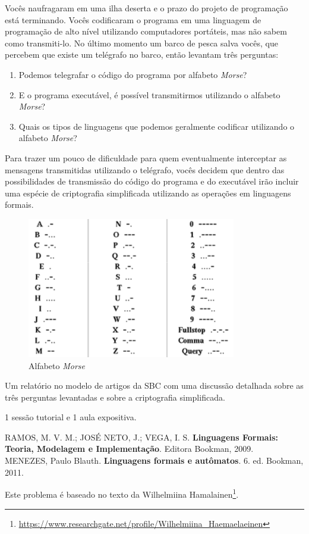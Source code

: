 Vocês naufragaram em uma ilha deserta e o prazo do projeto de programação está terminando.
Vocês codificaram o programa em uma linguagem de programação de alto nível utilizando computadores
portáteis, mas não sabem como transmiti-lo.
No último momento um barco de pesca salva vocês, que percebem que existe um telégrafo no barco, então levantam três perguntas:
\begin{enumerate}
    \item Podemos telegrafar o código do programa por alfabeto \textit{Morse}?
    \item E o programa executável, é possível transmitirmos utilizando o alfabeto \textit{Morse}?
    \item Quais os tipos de linguagens que podemos geralmente codificar utilizando o alfabeto \textit{Morse}?
\end{enumerate}

Para trazer um pouco de dificuldade para quem eventualmente interceptar as mensagens transmitidas
utilizando o telégrafo, vocês decidem que dentro das possibilidades de transmissão do código do programa
e do executável irão incluir uma espécie de criptografia simplificada utilizando as operações
em linguagens formais.

\begin{figure}[!htb]
\centering
\includegraphics[scale=0.5]{apendice/problemas/problema1a/fig2.png}
\caption{Alfabeto \textit{Morse}}
\label{fig2}
\end{figure}

Um relatório no modelo de artigos da SBC com uma discussão detalhada sobre as três perguntas levantadas
e sobre a criptografia simplificada.

1 sessão tutorial e 1 aula expositiva.


\noindent
RAMOS, M. V. M.; JOSÉ NETO, J.; VEGA, I. S. \textbf{Linguagens Formais: Teoria, Modelagem e Implementação}. Editora Bookman, 2009.\\

\noindent
MENEZES, Paulo Blauth. \textbf{Linguagens formais e autômatos}. 6. ed. Bookman, 2011.\\


Este problema é baseado no texto da Wilhelmiina Hamalainen\footnote{\url{https://www.researchgate.net/profile/Wilhelmiina_Haemaelaeinen}}.
